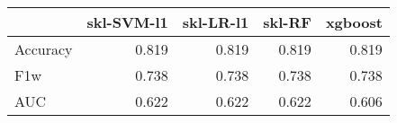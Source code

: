 \begin{tabular}{lrrrr}
\toprule
{} &  skl-SVM-l1 &  skl-LR-l1 &  skl-RF &  xgboost \\
\midrule
Accuracy &       0.819 &      0.819 &   0.819 &    0.819 \\
F1w      &       0.738 &      0.738 &   0.738 &    0.738 \\
AUC      &       0.622 &      0.622 &   0.622 &    0.606 \\
\bottomrule
\end{tabular}
